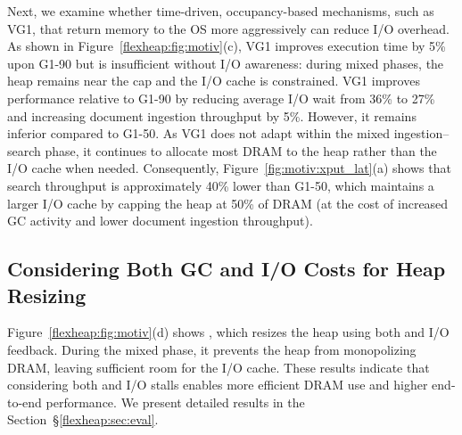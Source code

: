 Next, we examine whether time-driven, occupancy-based mechanisms, such as VG1, that return memory to the OS more aggressively can reduce I/O overhead.
As shown in Figure~\ref{flexheap:fig:motiv}(c), VG1 improves execution time by 5\% upon G1-90 but is insufficient without I/O awareness: during mixed phases, the heap remains near the cap and the I/O cache is constrained.
VG1 improves performance relative to G1-90 by reducing average I/O wait from 36\% to 27\% and increasing document ingestion throughput by 5\%.
However, it remains inferior compared to G1-50.
As VG1 does not adapt within the mixed ingestion–search phase, it continues to allocate most DRAM to the heap rather than the I/O cache when needed.
Consequently, Figure~\ref{fig:motiv:xput_lat}(a) shows that search throughput is approximately 40\% lower than G1-50, which maintains a larger I/O cache by capping the heap at 50\% of DRAM (at the cost of increased GC activity and lower document ingestion throughput).

\subsection{Considering Both GC and I/O Costs for Heap Resizing}

Figure~\ref{flexheap:fig:motiv}(d) shows \flexheapName{}, which resizes the heap using both \flexheapGC{} and I/O feedback.
During the mixed phase, it prevents the heap from monopolizing DRAM, leaving sufficient room for the I/O cache.
These results indicate that considering both \flexheapGC{} and I/O stalls enables more efficient DRAM use and higher end-to-end performance.
We present detailed results in the Section~\S\ref{flexheap:sec:eval}.


